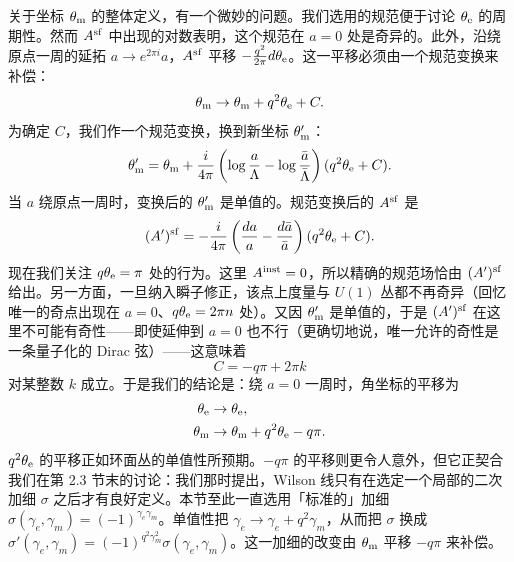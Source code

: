 关于坐标 $\theta_{\mathrm{m}}$ 的整体定义，有一个微妙的问题。我们选用的规范便于讨论 $\theta_{\mathrm{e}}$ 的周期性。然而 $A^{\mathrm{sf}}$ 中出现的对数表明，这个规范在 $a = 0$ 处是奇异的。此外，沿绕原点一周的延拓 $a \to e^{2 \pi i} a$，$A^{\mathrm{sf}}$ 平移 $- \frac{q^2}{2 \pi} d \theta_{\mathrm{e}}$。这一平移必须由一个规范变换来补偿：
\begin{equation}
\theta_{\mathrm{m}} \to \theta_{\mathrm{m}} + q^2 \theta_{\mathrm{e}} + C.
\end{equation}
为确定 $C$，我们作一个规范变换，换到新坐标 $\theta_{\mathrm{m}}'$：
\begin{equation}
\theta_{\mathrm{m}}' = \theta_{\mathrm{m}} + \frac{i}{4 \pi} \left( \log \frac{a}{\Lambda} - \log \frac{\bar a}{\bar\Lambda} \right) (q^2 \theta_{\mathrm{e}} + C).
\end{equation}
当 $a$ 绕原点一周时，变换后的 $\theta_{\mathrm{m}}'$ 是单值的。规范变换后的 $A^{\mathrm{sf}}$ 是
\begin{equation}
(A')^{\mathrm{sf}} = - \frac{i}{4 \pi} \left( \frac{da}{a} - \frac{d \bar a}{\bar a} \right) (q^2 \theta_{\mathrm{e}} + C).
\end{equation}
现在我们关注 $q \theta_{\mathrm{e}} = \pi$ 处的行为。这里 $A^{\mathrm{inst}} = 0$，所以精确的规范场恰由 $(A')^{\mathrm{sf}}$ 给出。另一方面，一旦纳入瞬子修正，该点上度量与 $U(1)$ 丛都不再奇异（回忆唯一的奇点出现在 $a=0$、$q \theta_{\mathrm{e}} = 2 \pi n$ 处）。又因 $\theta_{\mathrm{m}}'$ 是单值的，于是 $(A')^{\mathrm{sf}}$ 在这里不可能有奇性——即使延伸到 $a=0$ 也不行（更确切地说，唯一允许的奇性是一条量子化的 Dirac 弦）——这意味着
\begin{equation}
C = - q \pi + 2 \pi  k
\end{equation}
对某整数 $k$ 成立。于是我们的结论是：绕 $a = 0$ 一周时，角坐标的平移为
\begin{subequations}
\begin{align} \label{eq:angle-monodromy}
\theta_{\mathrm{e}} &\to \theta_{\mathrm{e}}, \\
\theta_{\mathrm{m}} &\to \theta_{\mathrm{m}} + q^2 \theta_{\mathrm{e}} - q \pi. \label{angle-monodromy-varphi}
\end{align}
\end{subequations}
$q^2 \theta_{\mathrm{e}}$ 的平移正如环面丛的单值性所预期。$-q \pi$ 的平移则更令人意外，但它正契合我们在第 2.3 节末的讨论：我们那时提出，Wilson 线只有在选定一个局部的二次加细 $\sigma$ 之后才有良好定义。本节至此一直选用「标准的」加细 $\sigma(\gamma_e,\gamma_m) = (-1)^{\gamma_e \gamma_m}$。单值性把 $\gamma_e \to \gamma_e + q^2 \gamma_m$，从而把 $\sigma$ 换成 $\sigma'(\gamma_e,\gamma_m) = (-1)^{q^2 \gamma_m^2} \sigma(\gamma_e,\gamma_m)$。这一加细的改变由 $\theta_{\mathrm{m}}$ 平移 $-q \pi$ 来补偿。%


